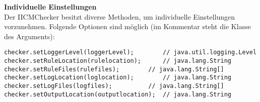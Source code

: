 \textbf{Individuelle Einstellungen}\\
Der IICMChecker besitzt diverse Methoden, um individuelle Einstellungen vorzunehmen.
Folgende Optionen sind möglich (im Kommentar steht die Klasse des Arguments):
\begin{verbatim}
checker.setLoggerLevel(loggerLevel);    	// java.util.logging.Level
checker.setRuleLocation(rulelocation);  	// java.lang.String
checker.setRuleFiles(rulefiles);  		// java.lang.String[]
checker.setLogLocation(loglocation);		// java.lang.String
checker.setLogFiles(logfiles);			// java.lang.String[]
checker.setOutputLocation(outputlocation);	// java.lang.String
\end{verbatim}

